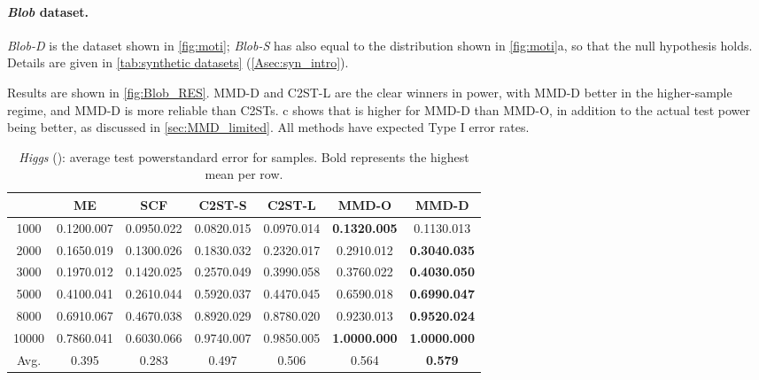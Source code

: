 \documentclass{article}
\newcommand{\mnstd}[2]{#1{\scriptsize#2}}
\begin{document}
\vspace{-1.5ex}\paragraph{\emph{Blob} dataset.}
\emph{Blob-D} is the dataset shown in \cref{fig:moti};
\emph{Blob-S} has  also equal to the distribution shown in \cref{fig:moti}a, so that the null hypothesis holds.
Details are given in \cref{tab:synthetic datasets} (\cref{Asec:syn_intro}).

Results are shown in \cref{fig:Blob_RES}.
MMD-D and C2ST-L are the clear winners in power,
with MMD-D better in the higher-sample regime, and MMD-D is more reliable than C2STs.
c shows that  is higher for MMD-D than MMD-O,
in addition to the actual test power being better,
as discussed in \cref{sec:MMD_limited}.
All methods have expected Type I error rates.




\begin{table*}[ht]
\centering
  \footnotesize
  \caption{\emph{Higgs} (): average test powerstandard error for  samples. Bold represents the highest mean per row.} \label{tab:Higgs_RES1}
\vspace{1mm}
\begin{tabular}{c|cccccc}
\toprule
 & ME & SCF & C2ST-S & C2ST-L &MMD-O & MMD-D \\
\midrule
\phantom{1}1000 & \mnstd{0.120}{0.007} & \mnstd{0.095}{0.022} & \mnstd{0.082}{0.015} & \mnstd{0.097}{0.014} & \mnstd{\bf 0.132}{0.005} & \mnstd{0.113}{0.013} \\
\phantom{1}2000 & \mnstd{0.165}{0.019} & \mnstd{0.130}{0.026} & \mnstd{0.183}{0.032} & \mnstd{0.232}{0.017} & \mnstd{0.291}{0.012} & \mnstd{\bf 0.304}{0.035} \\
\phantom{1}3000 & \mnstd{0.197}{0.012} & \mnstd{0.142}{0.025} & \mnstd{0.257}{0.049} & \mnstd{0.399}{0.058} & \mnstd{0.376}{0.022} & \mnstd{\bf 0.403}{0.050} \\
\phantom{1}5000 & \mnstd{0.410}{0.041} & \mnstd{0.261}{0.044} & \mnstd{0.592}{0.037} & \mnstd{0.447}{0.045} & \mnstd{0.659}{0.018} & \mnstd{\bf 0.699}{0.047} \\
\phantom{1}8000 & \mnstd{0.691}{0.067} & \mnstd{0.467}{0.038} & \mnstd{0.892}{0.029} & \mnstd{0.878}{0.020} & \mnstd{0.923}{0.013} & \mnstd{\bf 0.952}{0.024} \\
          10000 & \mnstd{0.786}{0.041} & \mnstd{0.603}{0.066} & \mnstd{0.974}{0.007} & \mnstd{0.985}{0.005} & \mnstd{\bf 1.000}{0.000} & \mnstd{\bf 1.000}{0.000} \\
\midrule
Avg. & 0.395 & 0.283 & 0.497 & 0.506 & 0.564 & {\bf 0.579} \\
\bottomrule
\end{tabular}
\vspace{-1em}
\end{table*}
\end{document}
